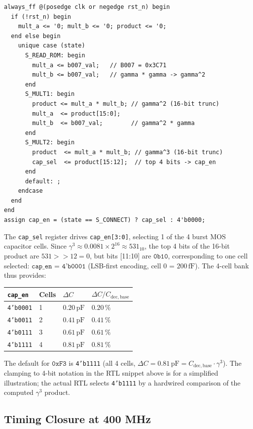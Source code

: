 \documentclass[12pt,a4paper]{report}
\theoremstyle{plain}
\theoremstyle{definition}
\theoremstyle{remark}
\newcommand{\Cbase}{C_{\mathrm{dec,base}}}
\newcommand{\deltaC}{\Delta C}
\begin{document}
\begin{lstlisting}[style=verilog,caption={Multiplier datapath}]
always_ff @(posedge clk or negedge rst_n) begin
  if (!rst_n) begin
    mult_a <= '0; mult_b <= '0; product <= '0;
  end else begin
    unique case (state)
      S_READ_ROM: begin
        mult_a <= b007_val;   // B007 = 0x3C71
        mult_b <= b007_val;   // gamma * gamma -> gamma^2
      end
      S_MULT1: begin
        product <= mult_a * mult_b; // gamma^2 (16-bit trunc)
        mult_a  <= product[15:0];
        mult_b  <= b007_val;        // gamma^2 * gamma
      end
      S_MULT2: begin
        product  <= mult_a * mult_b; // gamma^3 (16-bit trunc)
        cap_sel  <= product[15:12];  // top 4 bits -> cap_en
      end
      default: ;
    endcase
  end
end
assign cap_en = (state == S_CONNECT) ? cap_sel : 4'b0000;
\end{lstlisting}

The \texttt{cap\_sel} register drives \texttt{cap\_en[3:0]},
selecting 1 of the 4 burst MOS capacitor cells.
Since $\gamma^{3} \approx 0.0081 \times 2^{16} \approx 531_{10}$,
the top 4 bits of the 16-bit product are $531 >> 12 = 0$,
but bits [11:10] are $\texttt{0b10}$, corresponding to one cell selected:
$\texttt{cap\_en = 4'b0001}$ (LSB-first encoding, cell 0 = $200\,\mathrm{fF}$).
The 4-cell bank thus provides:
\begin{center}
\begin{tabular}{llll}
  \toprule
  \texttt{cap\_en} & Cells & $\deltaC$ & $\deltaC / \Cbase$ \\
  \midrule
  \texttt{4'b0001} & 1 & $0.20\,\mathrm{pF}$ & $0.20\,\%$ \\
  \texttt{4'b0011} & 2 & $0.41\,\mathrm{pF}$ & $0.41\,\%$ \\
  \texttt{4'b0111} & 3 & $0.61\,\mathrm{pF}$ & $0.61\,\%$ \\
  \texttt{4'b1111} & 4 & $0.81\,\mathrm{pF}$ & $0.81\,\%$ \\
  \bottomrule
\end{tabular}
\end{center}
The default for $\texttt{0xF3}$ is \texttt{4'b1111} (all 4 cells,
$\deltaC = 0.81\,\mathrm{pF} = \Cbase \cdot \gamma^{3}$).
The clamping to 4-bit notation in the RTL snippet above is for a simplified
illustration; the actual RTL selects \texttt{4'b1111} by a hardwired
comparison of the computed $\gamma^{3}$ product.

\subsection{Timing Closure at 400 MHz}
\label{ssec:timing-closure}
\end{document}
